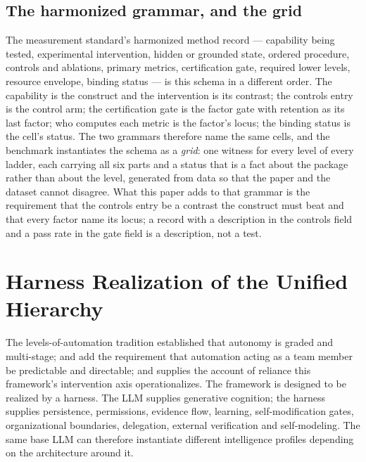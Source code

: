 \subsection{The harmonized grammar, and the grid}
The measurement standard's harmonized method record --- capability being tested, experimental intervention, hidden or grounded state, ordered procedure, controls and ablations, primary metrics, certification gate, required lower levels, resource envelope, binding status --- is this schema in a different order. The capability is the construct and the intervention is its contrast; the controls entry is the control arm; the certification gate is the factor gate with retention as its last factor; who computes each metric is the factor's locus; the binding status is the cell's status. The two grammars therefore name the same cells, and the benchmark instantiates the schema as a \emph{grid}: one witness for every level of every ladder, each carrying all six parts and a status that is a fact about the package rather than about the level, generated from data so that the paper and the dataset cannot disagree. What this paper adds to that grammar is the requirement that the controls entry be a contrast the construct must beat and that every factor name its locus; a record with a description in the controls field and a pass rate in the gate field is a description, not a test.

\section{Harness Realization of the Unified Hierarchy}

The levels-of-automation tradition \citep{sheridan1978,parasuraman2000,endsley1999} established that autonomy is graded and multi-stage; \citet{klein2004} and \citet{amershi2019} add the requirement that automation acting as a team member be predictable and directable; and \citet{lee2004} supplies the account of reliance this framework's intervention axis operationalizes. The framework is designed to be realized by a harness. The LLM supplies generative cognition; the harness supplies persistence, permissions, evidence flow, learning, self-modification gates, organizational boundaries, delegation, external verification and self-modeling. The same base LLM can therefore instantiate different intelligence profiles depending on the architecture around it.

